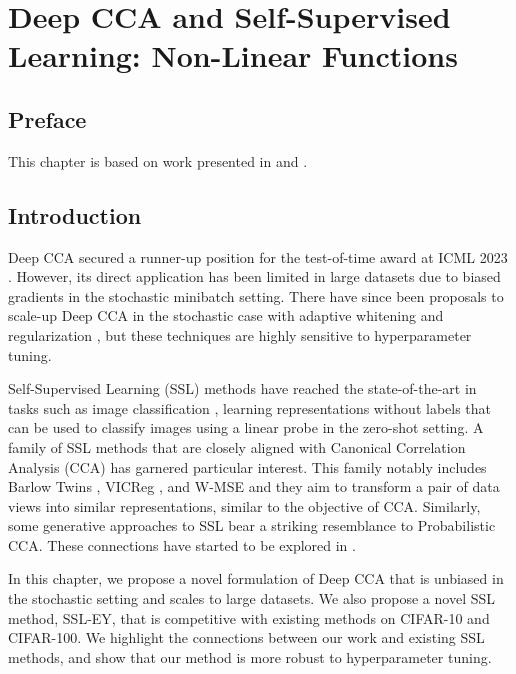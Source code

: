 \graphicspath{{chapters/deep_learning/}}

\chapter{Deep CCA and Self-Supervised Learning: Non-Linear Functions}\label{ch:deep_learning}
\minitoc
\section*{Preface}

This chapter is based on work presented in \citet{chapman2023cca} and \citet{chapman2023efficient}.

\section{Introduction}

Deep CCA \citep{andrew2013deep} secured a runner-up position for the test-of-time award at ICML 2023 \citep{ICML2023TOT}.
However, its direct application has been limited in large datasets due to biased gradients in the stochastic minibatch setting.
There have since been proposals to scale-up Deep CCA in the stochastic case with adaptive whitening \citep{wang2015stochastic} and regularization \cite{chang2018scalable}, but these techniques are highly sensitive to hyperparameter tuning.

Self-Supervised Learning (SSL) methods have reached the state-of-the-art in tasks such as image classification \citep{balestriero2023cookbook}, learning representations without labels that can be used to classify images using a linear probe in the zero-shot setting.
A family of SSL methods that are closely aligned with Canonical Correlation Analysis (CCA) has garnered particular interest.
This family notably includes Barlow Twins \citep{zbontar2021barlow}, VICReg \citep{bardes2021vicreg}, and W-MSE \citep{ermolov2021whitening} and they aim to transform a pair of data views into similar representations, similar to the objective of CCA. Similarly, some generative approaches to SSL\cite{sansone2022gedi} bear a striking resemblance to Probabilistic CCA\cite{bach2005probabilistic}.
These connections have started to be explored in \cite{balestriero2022contrastive}.

In this chapter, we propose a novel formulation of Deep CCA that is unbiased in the stochastic setting and scales to large datasets.
We also propose a novel SSL method, SSL-EY, that is competitive with existing methods on CIFAR-10 and CIFAR-100.
We highlight the connections between our work and existing SSL methods, and show that our method is more robust to hyperparameter tuning.


